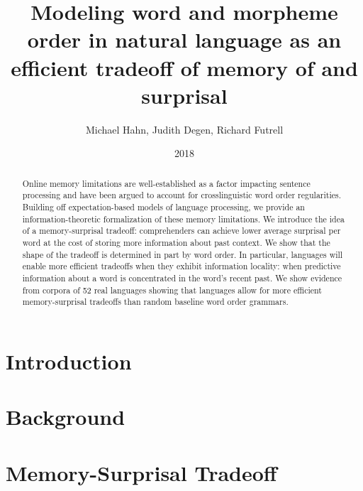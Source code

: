 \documentclass[11pt,letterpaper]{article}
\title{Modeling word and morpheme order in natural language as an efficient tradeoff of memory of and surprisal}
\author{Michael Hahn, Judith Degen, Richard Futrell}
\date{2018}
\begin{document}
\maketitle


\begin{abstract}
Online memory limitations are well-established as a factor impacting sentence processing and have been argued to account for crosslinguistic word order regularities. Building off expectation-based models of language processing, we provide an information-theoretic formalization of these memory limitations. We introduce the idea of a memory-surprisal tradeoff: comprehenders can achieve lower average surprisal per word at the cost of storing more information about past context. We show that the shape of the tradeoff is determined in part by word order. In particular, languages will enable more efficient tradeoffs when they exhibit information locality: when predictive information about a word is concentrated in the word’s recent past. We show evidence from corpora of 52 real languages showing that languages allow for more efficient memory-surprisal tradeoffs than random baseline word order grammars. 
\end{abstract}


% 


 
\section{Introduction}





\section{Background}\label{sec:background}




\section{Memory-Surprisal Tradeoff}\label{sec:ms-tradeoff}
\end{document}
